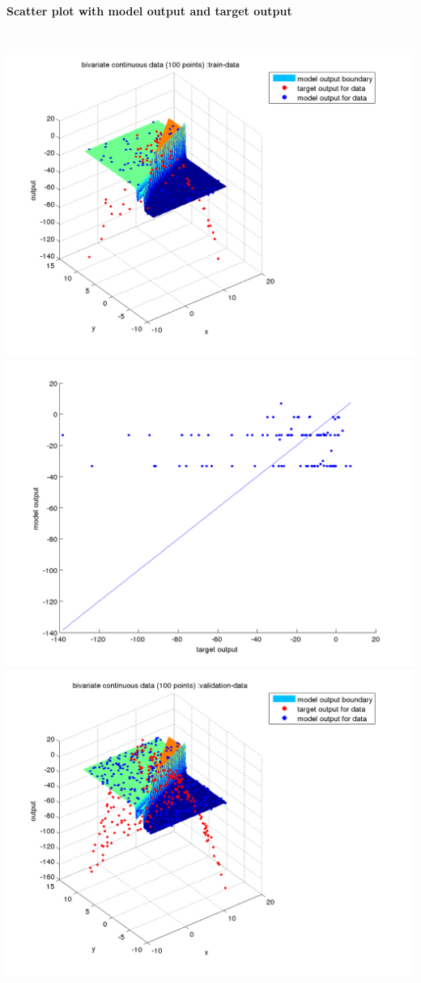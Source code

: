 \documentclass[fleqn]{article}
\newcommand{\myparagraph}[1]{\paragraph{#1}\mbox{}\\}
\begin{document}
\myparagraph{Scatter plot with model output and target output}
\includegraphics[scale=0.4]{./pics/bivariate100/_2_4/_2_4_epoch_1_train-data_scatter3d}
\includegraphics[scale=0.4]{./pics/bivariate100/_2_4/_2_4_epoch_1_train-data_scatter2d}
\includegraphics[scale=0.4]{./pics/bivariate100/_2_4/_2_4_epoch_1_validation-data_scatter3d}
\end{document}
